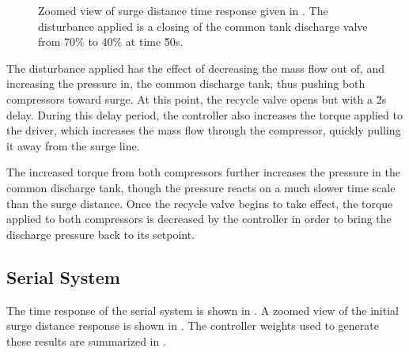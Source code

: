 \begin{figure}
  \centering
  \footnotesize
  
  \normalsize
  \caption[Zoomed view of surge distance time response of parallel system.]{Zoomed view of surge distance time response given in . The disturbance applied is a closing of the common tank discharge valve from 70\% to 40\% at time \u{50}{s}.}
  \label{fig:res:parallel-sd-zoom}
\end{figure}

\fi

The disturbance applied has the effect of decreasing the mass flow out of, and increasing the pressure in, the common discharge tank, thus pushing both compressors toward surge.
At this point, the recycle valve opens but with a \u{2}{s} delay.
During this delay period, the controller also increases the torque applied to the driver, which increases the mass flow through the compressor, quickly pulling it away from the surge line.

The increased torque from both compressors further increases the pressure in the common discharge tank, though the pressure reacts on a much slower time scale than the surge distance.
Once the recycle valve begins to take effect, the torque applied to both compressors is decreased by the controller in order to bring the discharge pressure back to its setpoint.


\subsection{Serial System}
\label{sec:results:performance:serial}
\makeplotstrue

The time response of the serial system is shown in .
A zoomed view of the initial surge distance response is shown in .
The controller weights used to generate these results are summarized in .

